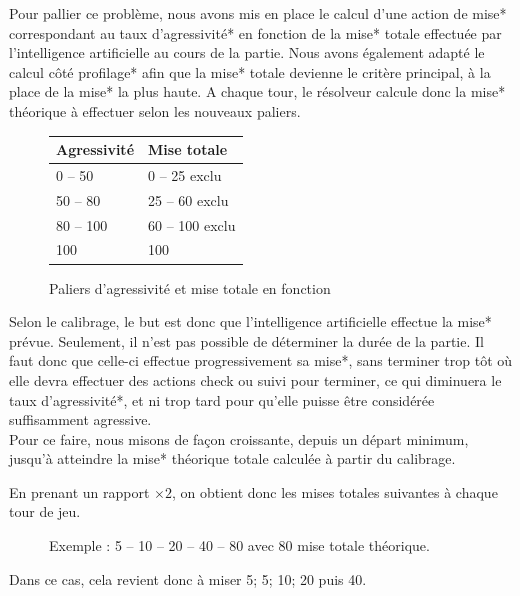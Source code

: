 \documentclass{report}
\begin{document}
Pour pallier ce problème, nous avons mis en place le calcul d'une action de mise* correspondant au taux d'agressivité* en fonction de la mise* totale effectuée par l'intelligence artificielle au cours de la partie. Nous avons également adapté le calcul côté profilage* afin que la mise* totale devienne le critère principal, à la place de la mise* la plus haute.
A chaque tour, le résolveur calcule donc la mise* théorique à effectuer selon les nouveaux paliers.\par


\begin{figure}[H]
\begin{center}
\begin{tabular}{|l|l|}
	\hline
   Agressivité & Mise totale \\
   \hline
   0 – 50 & 0 – 25	exclu \\
   \hline
   50 – 80 & 25 – 60 exclu\\
   \hline
   80 – 100 & 60 – 100 exclu\\
   \hline
   100 & 100\\
   \hline
\end{tabular}	
\end{center}
\caption{Paliers d'agressivité et mise totale en fonction}
\end{figure}

Selon le calibrage, le but est donc que l'intelligence artificielle effectue la mise* prévue. Seulement, il n'est pas possible de déterminer la durée de la partie. Il faut donc que celle-ci effectue progressivement sa mise*, sans terminer trop tôt où elle devra effectuer des actions check ou suivi pour terminer, ce qui diminuera le taux d'agressivité*, et ni trop tard pour qu'elle puisse être considérée suffisamment agressive.\\

Pour ce faire, nous misons de façon croissante, depuis un départ minimum, jusqu'à atteindre la mise* théorique totale calculée à partir du calibrage.\par
En prenant un rapport $\times2$, on obtient donc les mises totales suivantes à chaque tour de jeu.\par

\begin{figure}[H]
\begin{center}
Exemple : 	5 – 10 – 20 – 40 – 80 		avec 80 mise totale théorique.
\end{center}
\end{figure}
Dans ce cas, cela revient donc à miser 5; 5; 10; 20 puis 40.\\
\end{document}
